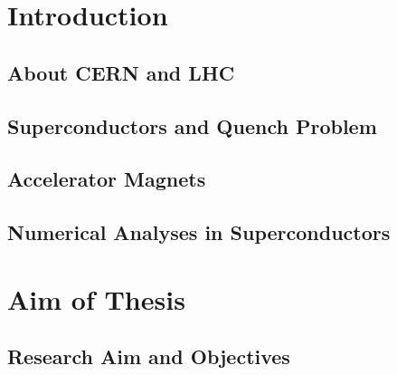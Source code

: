 \documentclass[11pt,a4paper]{report}
\begin{document}


\setcounter{page}{1}
\clearpage\thispagestyle{empty}
\tableofcontents
\clearpage\thispagestyle{empty}

% 

\chapter{Introduction}
\label{chapter: introduction}

\section{About CERN and LHC}
\label{section: about cern}


\section{Superconductors and Quench Problem}
\label{section: superconductors}


\section{Accelerator Magnets}
\label{section: accelerator_magnets}


\section{Numerical Analyses in Superconductors}
\label{section: numerical_analyses_in_superconductors}


\clearpage \thispagestyle{empty}
\chapter{Aim of Thesis}
\label{chapter: aim_thesis}

\section{Research Aim and Objectives}

\end{document}
